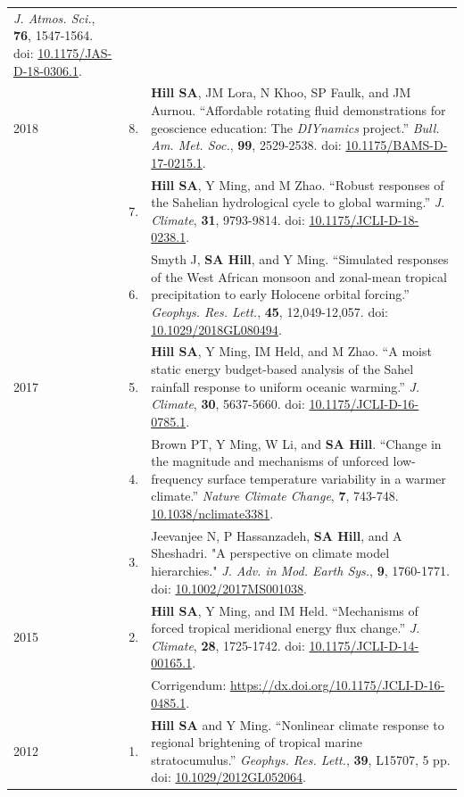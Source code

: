 \documentclass[letterpaper,11pt]{shillcv}
\begin{document}
\begin{longtable}{@{} Y{0.05\textwidth} >{\color{black}} p{0.04\textwidth} @{} L{0.91\textwidth} @{}}
\emph{J. Atmos. Sci.}, \textbf{76}, 1547-1564.  doi: \href{https://doi.org/10.1175/JAS-D-18-0306.1}{10.1175/JAS-D-18-0306.1}.\\
2018 & 8. & \textbf{Hill SA}, JM Lora, N Khoo, SP Faulk, and
JM Aurnou.  ``Affordable rotating fluid demonstrations for
geoscience education: The \emph{DIYnamics} project.''  \emph{Bull.
Am. Met. Soc.}, \textbf{99}, 2529-2538.  doi: \href{https://doi.org/10.1175/BAMS-D-17-0215.1}{10.1175/BAMS-D-17-0215.1}.\\
     & 7. & \textbf{Hill SA}, Y Ming, and M Zhao.  ``Robust responses of the
Sahelian hydrological cycle to global warming.''  \emph{J. Climate}, \textbf{31}, 9793-9814.  doi: \href{https://doi.org/10.1175/JCLI-D-18-0238.1}{10.1175/JCLI-D-18-0238.1}.\\
     & 6. & Smyth J, \textbf{SA Hill}, and Y Ming.  ``Simulated responses of
the West African monsoon and zonal-mean tropical precipitation to early
Holocene orbital forcing.''  \emph{Geophys. Res. Lett.}, \textbf{45},
12,049-12,057.  doi: \href{https://doi.org/10.1029/2018GL080494}{10.1029/2018GL080494}.\\
2017 & 5. & \textbf{Hill SA}, Y Ming, IM Held, and M Zhao.  ``A moist
static energy budget-based analysis of the Sahel rainfall response to uniform
oceanic warming.''  \emph{J. Climate}, \textbf{30}, 5637-5660.  doi: \href{https://doi.org/10.1175/JCLI-D-16-0785.1}{10.1175/JCLI-D-16-0785.1}.\\
     & 4. & Brown PT, Y Ming, W Li, and \textbf{SA Hill}.  ``Change
in the magnitude and mechanisms of unforced low-frequency surface temperature
variability in a warmer climate.''  \emph{Nature Climate Change}, \textbf{7}, 743-748.  \href{https://doi.org/10.1038/nclimate3381}{10.1038/nclimate3381}.\\
     & 3. & Jeevanjee N, P Hassanzadeh, \textbf{SA Hill}, and A Sheshadri.  "A perspective on climate model hierarchies."  \emph{J.  Adv. in Mod. Earth Sys.}, \textbf{9}, 1760-1771.  doi: \href{https://doi.org/10.1002/2017MS001038}{10.1002/2017MS001038}.\\
2015 & 2. & \textbf{Hill SA}, Y Ming, and IM Held.  ``Mechanisms of forced
tropical meridional energy flux change.''  \emph{J. Climate}, \textbf{28}, 1725-1742.  doi: \href{http://dx.doi.org/10.1175/JCLI-D-14-00165.1}{10.1175/JCLI-D-14-00165.1}.\\
& & \hspace{1cm} Corrigendum: \href{https://dx.doi.org/10.1175/JCLI-D-16-0485.1}{https://dx.doi.org/10.1175/JCLI-D-16-0485.1}.\\
2012 & 1. & \textbf{Hill SA} and Y Ming.  ``Nonlinear climate response to regional
brightening of tropical marine stratocumulus.''  \emph{Geophys. Res. Lett.},
\textbf{39}, L15707, 5 pp.  doi: \href{http://dx.doi.org/10.1029/2012GL052064}{10.1029/2012GL052064}.\\
\end{longtable}
\end{document}
